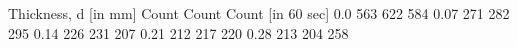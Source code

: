 Thickness, d [in mm]	Count	Count	Count [in 60 sec]
0.0			563	622	584
0.07			271	282	295
0.14			226	231	207
0.21			212	217	220
0.28			213	204	258